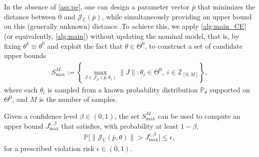 \documentclass[journal,twoside,web,final]{ieeecolor}
\theoremstyle{definition}
\newcommand{\Z}{\mathbb{Z}}
\newcommand{\J}{\mathcal{J}}
\newcommand{\C}{\mathbb{C}}
\newcommand{\Cb}{{\bar{\mathcal{C}}}}
\begin{document}
In the absence of \cref{ass:pe}, 
one can design a parameter vector $\bar{p}$ that minimizes the distance between $0$ and $\J_\C(\bar{p})$,
while simultaneously providing an upper bound on this (generally unknown) distance.
To achieve this, we apply \cref{alg:main_CE} (or equivalently, \cref{alg:main}) without updating the nominal model,
that is, by fixing $\theta^k \equiv \theta^0$ and exploit the fact that $\theta \in \Theta^0$, to construct a set of candidate upper bounds
\begin{align} \label{eq:imperfect_learning:Smax}
S_{\text{max}}^M := \left\{{\textstyle\max_{J\in \J_\Cb(\bar{p},\theta_i)}} \|J\| : \theta_i \in \Theta^0, ~ i\in\Z_{[0,M]}\right\},
\end{align}
where each $\theta_i$ is sampled from a known probability distribution $\mathbb{P}_\theta$ supported on $\Theta^0$, and $M$ is the number of samples.

Given a confidence level $\beta \in (0,1)$,
the set $S_{\text{max}}^M$ can be used to compute an upper bound $J_\text{max}^{\epsilon,\beta}$ that satisfies,
with probability at least $1 - \beta$,
\begin{align}
\mathbb{P}\big[ \| \J_\C(\bar{p},\theta) \| > J_\text{max}^{\epsilon,\beta} \big] \leq \epsilon,
\end{align}
for a prescribed violation risk $\epsilon \in (0,1)$.
\end{document}
